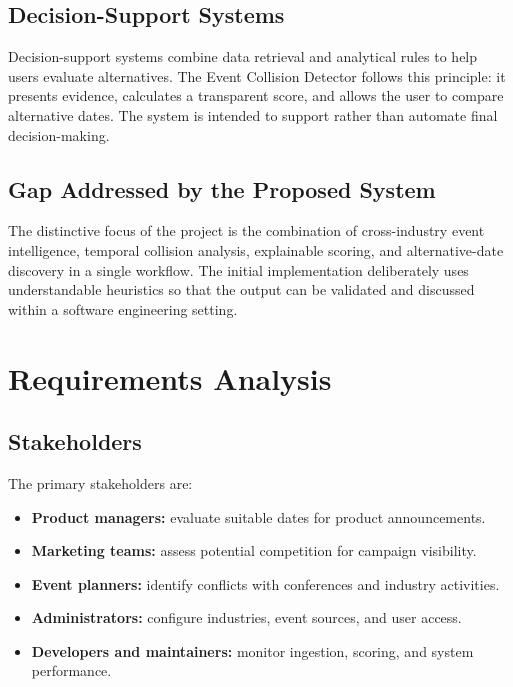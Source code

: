 \documentclass[12pt]{article}
\begin{document}
\subsection{Decision-Support Systems}
Decision-support systems combine data retrieval and analytical rules to help users evaluate alternatives. The Event Collision Detector follows this principle: it presents evidence, calculates a transparent score, and allows the user to compare alternative dates. The system is intended to support rather than automate final decision-making.

\subsection{Gap Addressed by the Proposed System}
The distinctive focus of the project is the combination of cross-industry event intelligence, temporal collision analysis, explainable scoring, and alternative-date discovery in a single workflow. The initial implementation deliberately uses understandable heuristics so that the output can be validated and discussed within a software engineering setting.

\section{Requirements Analysis}

\subsection{Stakeholders}
The primary stakeholders are:
\begin{itemize}[leftmargin=0.7cm]
\item \textbf{Product managers:} evaluate suitable dates for product announcements.
\item \textbf{Marketing teams:} assess potential competition for campaign visibility.
\item \textbf{Event planners:} identify conflicts with conferences and industry activities.
\item \textbf{Administrators:} configure industries, event sources, and user access.
\item \textbf{Developers and maintainers:} monitor ingestion, scoring, and system performance.
\end{itemize}
\end{document}

